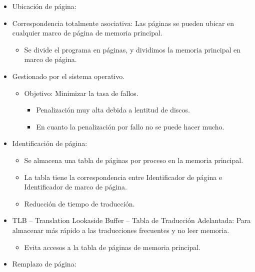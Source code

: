 \documentclass[12pt, twoside, openright]{report} %
\begin{document}
\begin{itemize}
	\item Ubicación de página:
	\item Correspondencia totalmente asociativa: Las páginas se pueden ubicar
	      en cualquier marco de página de memoria principal.

	      \begin{itemize}

		      \item Se divide el programa en páginas, y dividimos la memoria principal
		            en marco de página.
	      \end{itemize}
	\item Gestionado por el sistema operativo.

	      \begin{itemize}

		      \item Objetivo: Minimizar la tasa de fallos.

		            \begin{itemize}

			            \item Penalización muy alta debida a lentitud de discos.
			            \item En cuanto la penalización por fallo no se puede hacer mucho.
		            \end{itemize}
	      \end{itemize}
	\item Identificación de página:

	      \begin{itemize}
		      \item Se almacena una tabla de páginas por proceso en la memoria
		            principal.
		      \item La tabla tiene la correspondencia entre Identificador de página e
		            Identificador de marco de página.

		      \item Reducción de tiempo de traducción.
	      \end{itemize}
	\item TLB -- Translation Lookaside Buffer -- Tabla de Traducción
	      Adelantada: Para almacenar más rápido a las traducciones frecuentes y
	      no leer memoria.

	      \begin{itemize}

		      \item Evita accesos a la tabla de páginas de memoria principal.
	      \end{itemize}
	\item Remplazo de página:


\end{itemize}
\end{document}
